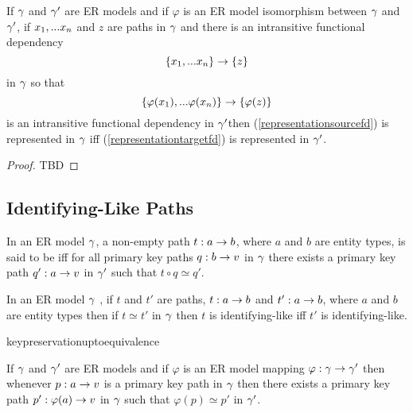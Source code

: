 \begin{lemma}
If $\gamma$ and $\gamma'$ are ER models and  if  $\varphi$ is an ER model isomorphism between $\gamma$  and $\gamma'$,  if $x_1,...x_n$ and $z$ are paths in $\gamma$
and there is an  intransitive functional dependency
\begin{equation}
\label{representationsourcefd}
\left\{x_1,...x_n\right\} \rightarrow \left\{z\right\}
\end{equation} 
in $\gamma$
so that
\begin{equation}
\label{representationtargetfd}
\left\{\varphi(x_1),...\varphi(x_n)\right\} \rightarrow \left\{\varphi(z)\right\}
\end{equation}
is an intransitive  functional dependency in $\gamma'$then
(\ref{representationsourcefd}) is represented in $\gamma$ iff
(\ref{representationtargetfd}) is represented in $\gamma'$.
\end{lemma}
\begin{proof}
TBD
\end{proof}

\subsection{ Identifying-Like Paths}

\begin{definition}
In an ER model $\gamma$, a non-empty path $t: a \rightarrow b$, where $a$ and $b$ are entity types, is said to be  iff  for all primary key paths $q:b \rightarrow v$ in $\gamma$ there exists a primary key path $q':a \rightarrow v$ in $\gamma'$ such that $t \circ q \simeq q'$.
\end{definition}

\begin{lemma}
In an ER model $\gamma$ , if $t$ and $t'$ are paths, $t:a \rightarrow b$ and $t':a \rightarrow b$, where $a$ and $b$ are entity types
then if $t \simeq t'$ in $\gamma$ then $t$ is identifying-like iff $t'$ is identifying-like.
\end{lemma}

keypreservationuptoequivalence
\begin{observation}
If $\gamma$ and $\gamma'$ are ER models and if $\varphi$ is an ER model mapping $\varphi: \gamma \rightarrow \gamma'$ then whenever 
$p:a \rightarrow v$ is a primary key path in $\gamma$ then there exists a primary key path 
$p':\varphi(a) \rightarrow v$ in $\gamma$ such that $\varphi(p) \simeq p'$ in $\gamma'$.
\end{observation}

